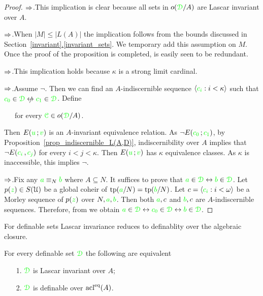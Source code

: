 \documentclass[creche.tex]{subfiles}
\begin{document}
\begin{proof}
  $\Rightarrow$.\quad This implication is clear because all sets in $o({\color{green}\EuScript D}/A)$ are Lascar invariant over $A$. 
  
  $\Rightarrow$.\quad When $|M|\le|L(A)|$ the implication follows from the bounds discussed in Section~\hyperref[invariant_sets]{\ref*{invariant}.\ref*{invariant_sets}}. We temporary add this assumption on $M$. Once the proof of the proposition is completed, is easily seen to be redundant. 
  
  $\Rightarrow$.\quad This implication holds because $\kappa$ is a strong limit cardinal.

  $\Rightarrow$.\quad Assume $\neg$. Then we can find an  $A\mbox{-}$indiscernible sequence $\langle{\color{green}c_i}:i<\kappa\rangle$ such that ${\gr c_0}\in\grD\niff {\gr c_1}\in\grD$. Define

  \ \ \ for every ${\color{green}\EuScript C}\in o({\color{green}\EuScript D}/A)$.

  Then $E({\color{green} u}\,;{\color{green} v})$ is an $A\mbox{-}$invariant equivalence relation. As $\neg E({\color{green} c_0}\,;{\color{green} c_1})$, by Proposition~\ref{prop_indiscernible_L(A,D)}, indiscernibility over $A$ implies that $\neg E({\color{green} c_i\,},{\color{green} c_j})$ for every $i<j<\kappa$. Then $E({\color{green} u}\,;{\color{green} v})$ has $\kappa$ equivalence classes. As $\kappa$ is inaccessible, this implies $\neg$.

  $\Rightarrow$.\quad Fix any ${\color{green} a}\equiv_N{\color{green} b}$ where $A\subseteq N$. It suffices to prove that ${\color{green} a}\in{\color{green}\EuScript D}\leftrightarrow{\color{green}b}\in{\color{green}\EuScript D}$. Let $p({\color{green} z})\in S(\EuScript U)$ be a global coheir of ${\rm tp}({\color{green} a}/N)={\rm tp}({\color{green} b}/N)$. Let $c=\langle{\color{green}c_i}:i<\omega\rangle$ be a Morley sequence of $p({\color{green} z})$ over $N,{\color{green} a},{\color{green} b}$. Then both ${\color{green} a},c$ and ${\color{green} b},c$ are $A\mbox{-}$indiscernible sequences. Therefore, from  we obtain ${\color{green} a}\in{\color{green}\EuScript D}\leftrightarrow{\color{green}c_0}\in{\color{green}\EuScript D}\leftrightarrow{\color{green}b}\in{\color{green}\EuScript D}$. 
\end{proof}

For definable sets Lascar invariance reduces to definablity over the algebraic closure.

\begin{corollary}
For every definable set ${\color{green}\EuScript D}$ the following are equivalent
  \begin{itemize}
    \item[1.] ${\color{green}\EuScript D}$ is Lascar invariant over $A$;
    \item[2.] ${\color{green}\EuScript D}$ is definable over $\mathop{\rm acl}^{{\rm eq}}(A)$.\QED
  \end{itemize}
\end{corollary}
\end{document}
